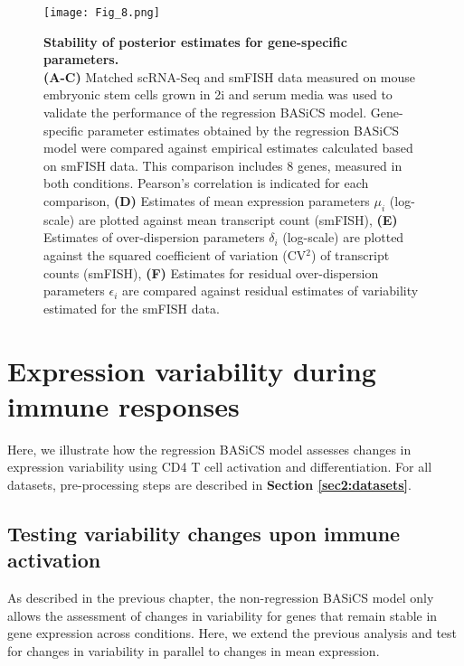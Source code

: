 \begin{figure}[!h]
\centering
\texttt{[image: Fig\_8.png]}
\caption[Stability of posterior estimates for gene-specific parameters]{\textbf{Stability of posterior estimates for gene-specific parameters.}\\
\textbf{(A-C)} Matched scRNA-Seq and smFISH data measured on mouse embryonic stem cells grown in 2i and serum media \citep{Grun2014} was used to validate the performance of the regression BASiCS model. 
Gene-specific parameter estimates obtained by the regression BASiCS model were compared against empirical estimates calculated based on smFISH data. 
This comparison includes 8 genes, measured in both conditions. Pearson's correlation is indicated for each comparison, 
\textbf{(D)} Estimates of mean expression parameters $\mu_i$ (log-scale) are plotted against mean transcript count (smFISH), 
\textbf{(E)} Estimates of over-dispersion parameters $\delta_i$ (log-scale) are plotted against the squared coefficient of variation (CV$^2$) of transcript counts (smFISH), 
\textbf{(F)} Estimates for residual over-dispersion parameters $\epsilon_i$ are compared against residual estimates of variability estimated for the smFISH data.}
\label{fig2:parameter_stabilization2}
\end{figure}

\newpage

\section{Expression variability during immune responses}

Here, we illustrate how the regression BASiCS model assesses changes in expression variability using CD4\plus{} T cell activation and differentiation. 
For all datasets, pre-processing steps are described in \textbf{Section \ref{sec2:datasets}}. 

\subsection{Testing variability changes upon immune activation}
\label{sec2:immune_activation}

As described in the previous chapter, the non-regression BASiCS model only allows the assessment of changes in variability for genes that remain stable in gene expression across conditions. 
Here, we extend the previous analysis and test for changes in variability in parallel to changes in mean expression. \\

